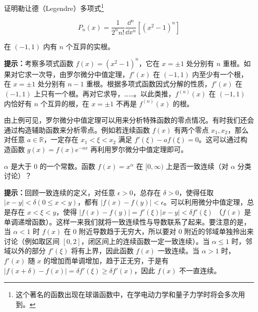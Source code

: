 \begin{exercise}{}
证明勒让德（Legendre）多项式\footnote{这个著名的函数出现在球谐函数中，在学电动力学和量子力学时将会多次用到。}

\begin{equation}
P_n(x)=\frac{1}{2^n n!}\frac{\dd{} ^n}{\dd x^n}[(x^2-1)^n]
\end{equation}

在 $(-1,1)$ 内有 $n$ 个互异的实根。

\textbf{提示：}考察多项式函数 $f(x)=(x^2-1)^n$，它在 $x=\pm 1$ 处分别有 $n$ 重根。如果对它求一次导，由罗尔微分中值定理，$f'(x)$ 在 $(-1,1)$ 内至少有一个根，在 $x=\pm 1$ 处分别有 $n-1$ 重根。根据多项式函数因式分解的性质，$f'(x)$ 在 $(-1,1)$ 上只有一个根。再对它求导，……。以此类推，$f^{(n)}(x)$ 在 $(-1,1)$ 内恰好有 $n$ 个互异的根，在 $x=\pm 1$ 不再是 $f^{(n)}(x)$ 的根。
\end{exercise}
由上例可见，罗尔微分中值定理可以用来分析特殊函数的零点情况。有时我们还会通过构造辅助函数来分析零点。例如若连续函数 $f(x)$ 有两个零点 $x_1,x_2$，那么对任意 $a\in \mathbb{R}$，一定存在 $x_1<\xi<x_2$ 满足 $f'(\xi)-af(\xi)=0$。这可以通过构造函数 $g(x)=f(x)e^{-ax}$ 再利用罗尔微分中值定理即可。

\begin{exercise}{}
$\alpha$ 是大于 $0$ 的一个常数。函数 $f(x)=x^\alpha$ 在 $[0,\infty)$ 上是否一致连续（对 $\alpha$ 分类讨论）？

\textbf{提示：}回顾一致连续的定义，对任意 $\epsilon>0$，总存在 $\delta>0$，使得任取 $|x-y|<\delta(0\le x<y)$，都有 $|f(x)-f(y)|<\epsilon$。可以利用微分中值定理，总是存在 $x< \xi <y$，使得 $|f(x)-f(y)|=f'(\xi)|x-y|<\delta f'(\xi)$ （$f(x)$ 是单调递增函数）。这样一来我们就将一致连续性与导数联系了起来。要注意的是，当 $\alpha<1$ 时 $f(x)$ 在 $0$ 附近导数趋于无穷大，所以要对 $0$ 附近的邻域单独拎出来讨论（例如取区间 $[0,2]$，闭区间上的连续函数一定一致连续）。当 $\alpha\le1$ 时，邻域以外的部分 $f'(\xi)$ 将有上界，因此函数 $f(x)$ 一致连续。当 $\alpha>1$ 时，$f'(x)$ 随 $x$ 的增加而单调增加，趋于正无穷，于是有 $|f(x+\delta)-f(x)|=\delta f'(\xi) \ge\delta f'(x)$，因此 $f(x)$ 不一直连续。
\end{exercise}

